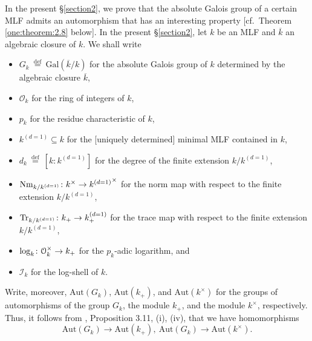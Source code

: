 \documentclass[12pt,showkeys]{amsart}
\theoremstyle{theorem}
\theoremstyle{definition}
\def\CalO{{\mathcal O}}
\def\Aut{{\mbox{Aut}}}
\def\defeq{ \ {\stackrel{\mathrm{def}}{=}} \ }
\begin{document}
In the present \S\ref{section2}, we prove that the absolute Galois group of a certain MLF admits
an automorphism that has an interesting property [cf.\ Theorem \ref{one:theorem:2.8} below]. In  the present \S \ref{section2}, let $k$ be an MLF and $\overline{k}$ an algebraic closure of $k$. 
We shall write
\begin{itemize}
  \item $G_k \defeq \mathrm{Gal}(\overline{k}/k)$ for the absolute Galois group of $k$ determined by the algebraic closure $\overline{k}$, 
  \item $\CalO_k$ for the ring of integers of $k$,
  \item $p_k$ for the residue characteristic of $k$,
  \item $k^{(d=1)} \subseteq k$ for the [uniquely determined] minimal MLF contained in $k$,
  \item $d_k \defeq [k:k^{(d=1)}]$ for the degree of the finite extension $k/k^{(d=1)}$, 
  \item ${\rm Nm}_{k/k^{(d=1)}}\colon k^\times \to {k^{(d = 1)}}^\times $ for the norm map with respect to the finite extension $k/k^{(d=1)}$, 
  \item ${\rm Tr}_{k/k^{(d=1)}}\colon k_+ \to k^{(d = 1)}_+ $ for the trace map with respect to the finite extension $k/k^{(d=1)}$,  
  \item ${\rm log}_k \colon \CalO^{\times}_k \rightarrow k_+$ for the $p_k$-adic logarithm, and 
  \item $\mathcal{I}_k$ for the log-shell of $k$. 
\end{itemize}
Write, moreover, $\mathrm{Aut}(G_k)$, $\mathrm{Aut}(k_+)$, and $\mathrm{Aut}(k^\times)$ for the groups of automorphisms of the group $G_k$, the module $k_+$, and the module $k^\times$, respectively.  Thus, it follows from \cite{Hoshi1}, Proposition 3.11, (i), (iv), that we have homomorphisms 
\begin{equation}
\Aut(G_k) \longrightarrow \Aut(k_+), \ \Aut(G_k) \longrightarrow \Aut(k^\times). \nonumber
\end{equation}
\end{document}
